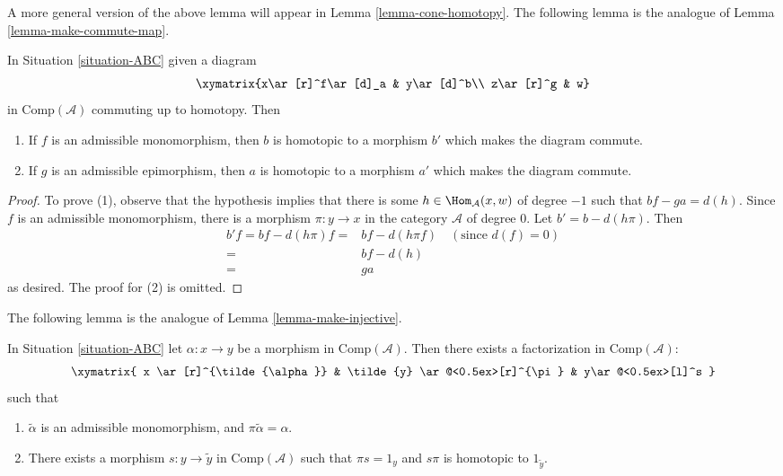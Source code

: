 \noindent
A more general version of the above lemma will appear in
Lemma \ref{lemma-cone-homotopy}. The following lemma is the
analogue of Lemma \ref{lemma-make-commute-map}.

\begin{lemma}
\label{lemma-homo-change}
In Situation \ref{situation-ABC} given a diagram
$$
\xymatrix{x\ar[r]^f\ar[d]_a & y\ar[d]^b\\
z\ar[r]^g & w}
$$
in $\text{Comp}(\mathcal{A})$ commuting up to homotopy. Then
\begin{enumerate}
\item If $f$ is an admissible monomorphism, then $b$ is homotopic
to a morphism $b'$ which makes the diagram commute.
\item If $g$ is an admissible epimorphism, then $a$ is homotopic
to a morphism $a'$ which makes the diagram commute.
\end{enumerate}
\end{lemma}

\begin{proof}
To prove (1), observe that the hypothesis implies that there is some
$h\in\Hom_{\mathcal{A}}(x,w)$ of degree $-1$ such that $bf-ga=d(h)$.
Since $f$ is an admissible monomorphism, there is a morphism
$\pi : y \to x$ in the category $\mathcal{A}$ of degree $0$.
Let $b' = b - d(h\pi)$. Then
\begin{align*}
b'f = bf - d(h\pi)f
= &
bf - d(h\pi f) \quad (\text{since }d(f) = 0) \\
= &
bf-d(h) \\
= &
ga
\end{align*}
as desired. The proof for (2) is omitted.
\end{proof}

\noindent
The following lemma is the analogue of Lemma \ref{lemma-make-injective}.

\begin{lemma}
\label{lemma-factor}
In Situation \ref{situation-ABC} let $\alpha : x \to y$
be a morphism in $\text{Comp}(\mathcal{A})$. Then there exists
a factorization in $\text{Comp}(\mathcal{A})$:
$$
\xymatrix{
x \ar[r]^{\tilde{\alpha}}  &
\tilde{y} \ar@<0.5ex>[r]^{\pi} &
y\ar@<0.5ex>[l]^s
}
$$
such that
\begin{enumerate}
\item $\tilde{\alpha}$ is an admissible monomorphism, and
$\pi\tilde{\alpha}=\alpha$.
\item There exists a morphism
$s:y\to\tilde{y}$ in $\text{Comp}(\mathcal{A})$
such that $\pi s=1_y$ and $s\pi$ is homotopic to $1_{\tilde{y}}$. 
\end{enumerate}
\end{lemma}

